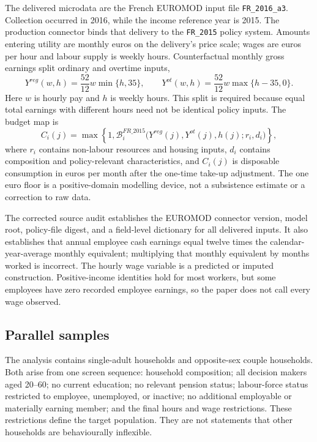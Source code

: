 \documentclass[11pt,a4paper]{article}
\begin{document}
The delivered microdata are the French EUROMOD input file
\texttt{FR\_2016\_a3}. Collection occurred in 2016, while the income reference
year is 2015. The production connector binds that delivery to the
\texttt{FR\_2015} policy system. Amounts entering utility are monthly euros on
the delivery's price scale; wages are euros per hour and labour supply is weekly
hours. Counterfactual monthly gross earnings split ordinary and overtime inputs,
\begin{equation}
Y^{reg}(w,h)=\frac{52}{12}w\min\{h,35\},\qquad
Y^{ot}(w,h)=\frac{52}{12}w\max\{h-35,0\}.
\label{eq:earnings}
\end{equation}
Here $w$ is hourly pay and $h$ is weekly hours. This split is required because
equal total earnings with different hours need not be identical policy inputs.
The budget map is
\begin{equation}
C_i(j)=\max\!\left\{1,
\mathcal B_i^{FR\_2015}\bigl(Y^{reg}(j),Y^{ot}(j),h(j);r_i,d_i\bigr)
\right\},
\label{eq:budget}
\end{equation}
where $r_i$ contains non-labour resources and housing inputs, $d_i$ contains
composition and policy-relevant characteristics, and $C_i(j)$ is disposable
consumption in euros per month after the one-time take-up adjustment. The one
euro floor is a positive-domain modelling device, not a subsistence estimate or
a correction to raw data.

The corrected source audit establishes the EUROMOD connector version, model
root, policy-file digest, and a field-level dictionary for all delivered inputs.
It also establishes that annual employee cash earnings equal twelve times the
calendar-year-average monthly equivalent; multiplying that monthly equivalent
by months worked is incorrect. The hourly wage variable is a predicted or
imputed construction. Positive-income identities hold for most workers, but
some employees have zero recorded employee earnings, so the paper does not call
every wage observed.

\subsection{Parallel samples}

The analysis contains \NSingles{} single-adult households and \NCouples{}
opposite-sex couple households. Both arise from one screen sequence: household
composition; all decision makers aged 20--60; no current education; no relevant
pension status; labour-force status restricted to employee, unemployed, or
inactive; no additional employable or materially earning member; and the final
hours and wage restrictions. These restrictions define the target population.
They are not statements that other households are behaviourally inflexible.
\end{document}
